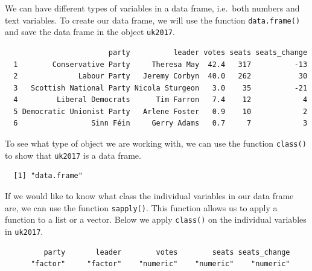 \documentclass[12pt,oneside]{reedthesis}
\theoremstyle{definition}
\theoremstyle{definition}
\theoremstyle{definition}
\theoremstyle{remark}
\begin{document}
  We can have different types of variables in a data frame, i.e.~both
  numbers and text variables. To create our data frame, we will use the
  function \texttt{data.frame()} and save the data frame in the object
  \texttt{uk2017}.
  \begin{Shaded}
  \begin{Highlighting}[]
  \StringTok{ }
  
  \end{Highlighting}
  \end{Shaded}
  \begin{verbatim}
                        party          leader votes seats seats_change
  1        Conservative Party     Theresa May  42.4   317          -13
  2              Labour Party   Jeremy Corbyn  40.0   262           30
  3   Scottish National Party Nicola Sturgeon   3.0    35          -21
  4         Liberal Democrats      Tim Farron   7.4    12            4
  5 Democratic Unionist Party   Arlene Foster   0.9    10            2
  6                 Sinn Féin     Gerry Adams   0.7     7            3
  \end{verbatim}
  To see what type of object we are working with, we can use the function
  \texttt{class()} to show that \texttt{uk2017} is a data frame.
  \begin{Shaded}
  \begin{Highlighting}[]
  \end{Highlighting}
  \end{Shaded}
  \begin{verbatim}
  [1] "data.frame"
  \end{verbatim}
  If we would like to know what class the individual variables in our data
  frame are, we can use the function \texttt{sapply()}. This function
  allows us to apply a function to a list or a vector. Below we apply
  \texttt{class()} on the individual variables in \texttt{uk2017}.
  \begin{Shaded}
  \begin{Highlighting}[]
  \end{Highlighting}
  \end{Shaded}
  \begin{verbatim}
         party       leader        votes        seats seats_change 
      "factor"     "factor"    "numeric"    "numeric"    "numeric" 
  \end{verbatim}
\end{document}
